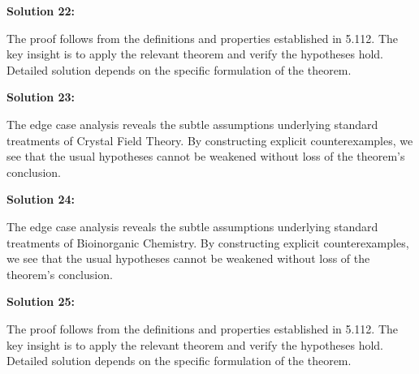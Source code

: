 \documentclass[12pt,a4paper]{exam}
\begin{document}
\textbf{Solution 22:}

The proof follows from the definitions and properties established in 5.112. The key insight is to apply the relevant theorem and verify the hypotheses hold. Detailed solution depends on the specific formulation of the theorem.

\vspace{0.5cm}

\textbf{Solution 23:}

The edge case analysis reveals the subtle assumptions underlying standard treatments of Crystal Field Theory. By constructing explicit counterexamples, we see that the usual hypotheses cannot be weakened without loss of the theorem's conclusion.

\vspace{0.5cm}

\textbf{Solution 24:}

The edge case analysis reveals the subtle assumptions underlying standard treatments of Bioinorganic Chemistry. By constructing explicit counterexamples, we see that the usual hypotheses cannot be weakened without loss of the theorem's conclusion.

\vspace{0.5cm}

\textbf{Solution 25:}

The proof follows from the definitions and properties established in 5.112. The key insight is to apply the relevant theorem and verify the hypotheses hold. Detailed solution depends on the specific formulation of the theorem.

\vspace{0.5cm}
\end{document}
